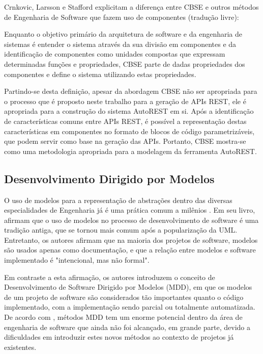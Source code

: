 Crnkovic, Larsson e Stafford explicitam a diferença entre CBSE e outros métodos de Engenharia de Software que fazem uso de componentes (tradução livre):

\begin{citacao}
Enquanto o objetivo primário da arquitetura de software e da engenharia de sistemas é entender o sistema através da sua divisão em componentes e da identificação de componentes como unidades compostas que expressam determinadas funções e propriedades, CBSE parte de dadas propriedades dos componentes e define o sistema utilizando estas propriedades.
\end{citacao}

Partindo-se desta definição, apesar da abordagem CBSE não ser apropriada para o processo que é proposto neste trabalho para a geração de APIs REST, ele é apropriada para a construção do sistema AutoREST em si. Após a identificação de características comuns entre APIs REST, é possível a representação destas características em componentes no formato de blocos de código parametrizáveis, que podem servir como base na geração das APIs. Portanto, CBSE mostra-se como uma metodologia apropriada para a modelagem da ferramenta AutoREST.


\subsection{Desenvolvimento Dirigido por Modelos}

O uso de modelos para a representação de abstrações dentro das diversas especialidades de Engenharia já é uma prática comum a milênios \cite{VITRUVIUS:1914}. Em seu livro,  afirmam que o uso de modelos no processo de desenvolvimento de software é uma tradição antiga, que se tornou mais comum após a popularização da UML. Entretanto, os autores afirmam que na maioria dos projetos de software, modelos são usados apenas como documentação, e que a relação entre modelos e software implementado é "intencional, mas não formal".

Em contraste a esta afirmação, os autores introduzem o conceito de Desenvolvimento de Software Dirigido por Modelos (MDD), em que os modelos de um projeto de software são considerados tão importantes quanto o código implementado, com a implementação sendo parcial ou totalmente automatizada. De acordo com , métodos MDD tem um enorme potencial dentro da área de engenharia de software que ainda não foi alcançado, em grande parte, devido a dificuldades em introduzir estes novos métodos ao contexto de projetos já existentes.

